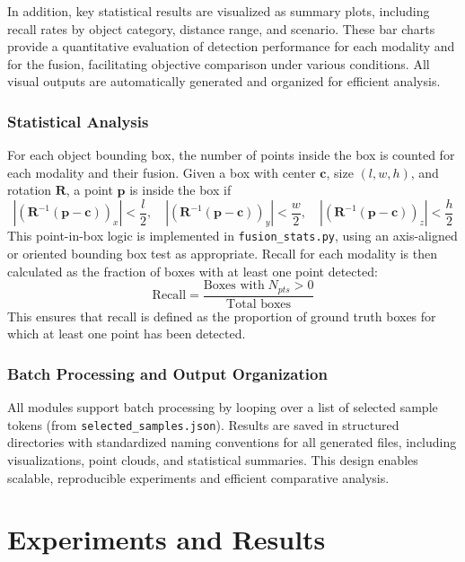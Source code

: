 \documentclass[10pt, a4paper, oneside]{article}
\begin{document}
In addition, key statistical results are visualized as summary plots, including recall rates by object category, distance range, and scenario. These bar charts provide a quantitative evaluation of detection performance for each modality and for the fusion, facilitating objective comparison under various conditions. All visual outputs are automatically generated and organized for efficient analysis.
	\subsubsection{Statistical Analysis}
For each object bounding box, the number of points inside the box is counted for each modality and their fusion. Given a box with center $\mathbf{c}$, size $(l, w, h)$, and rotation $\mathbf{R}$, a point $\mathbf{p}$ is inside the box if
\begin{equation}
\left| (\mathbf{R}^{-1} (\mathbf{p} - \mathbf{c}))_x \right| < \frac{l}{2}, \quad
\left| (\mathbf{R}^{-1} (\mathbf{p} - \mathbf{c}))_y \right| < \frac{w}{2}, \quad
\left| (\mathbf{R}^{-1} (\mathbf{p} - \mathbf{c}))_z \right| < \frac{h}{2}
\end{equation}
This point-in-box logic is implemented in \texttt{fusion\_stats.py}, using an axis-aligned or oriented bounding box test as appropriate. Recall for each modality is then calculated as the fraction of boxes with at least one point detected:
\begin{equation}
\text{Recall} = \frac{\text{Boxes with}\;N_{pts}>0}{\text{Total boxes}}
\end{equation}
This ensures that recall is defined as the proportion of ground truth boxes for which at least one point has been detected.



\subsubsection{Batch Processing and Output Organization}
All modules support batch processing by looping over a list of selected sample tokens (from \texttt{selected\_samples.json}). Results are saved in structured directories with standardized naming conventions for all generated files, including visualizations, point clouds, and statistical summaries. This design enables scalable, reproducible experiments and efficient comparative analysis.
\section{Experiments and Results}
\end{document}

